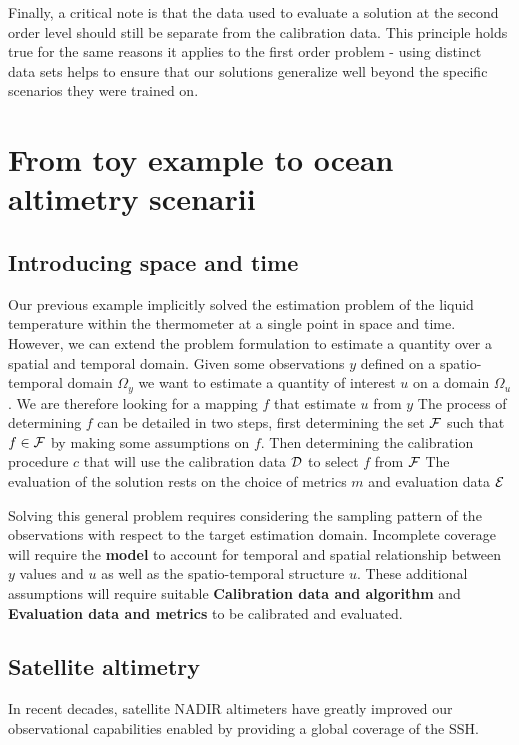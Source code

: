 \begin{bibunit}
Finally, a critical note is that the data used to evaluate a solution at the second order level should still be separate from the calibration data. This principle holds true for the same reasons it applies to the first order problem - using distinct data sets helps to ensure that our solutions generalize well beyond the specific scenarios they were trained on.

\section{From toy example to ocean altimetry scenarii}
\subsection{Introducing space and time}
Our previous example implicitly solved the estimation problem of the liquid temperature within the thermometer at a single point in space and time.
However, we can extend the problem formulation to estimate a quantity over a spatial and temporal domain.
Given some observations $y$ defined on a spatio-temporal domain $\Omega_y$ we want to estimate a quantity of interest $u$ on a domain $\Omega_u$. We are therefore looking for a mapping $f$ that estimate $u$ from $y$
The process of determining $f$ can be detailed in two steps, first determining the set $\cal{F}$ such that $f \in \cal{F}$ by making some assumptions on $f$. Then determining the calibration procedure $c$ that will use the calibration data $\cal{D}$ to select $f$ from $\cal{F}$
The evaluation of the solution rests on the choice of metrics $m$ and evaluation data $\cal{E}$

Solving this general problem requires considering the sampling pattern of the observations with respect to the target estimation domain.
Incomplete coverage will require the \textbf{model} to account for temporal and spatial relationship between $y$ values and $u$ as well as the spatio-temporal structure $u$.
These additional assumptions will require suitable \textbf{Calibration data and algorithm} and \textbf{Evaluation data and metrics} to be calibrated and evaluated.



\subsection{Satellite altimetry}


In recent decades, satellite NADIR altimeters have greatly improved our observational capabilities enabled by providing a global coverage of the SSH.


\end{bibunit}
